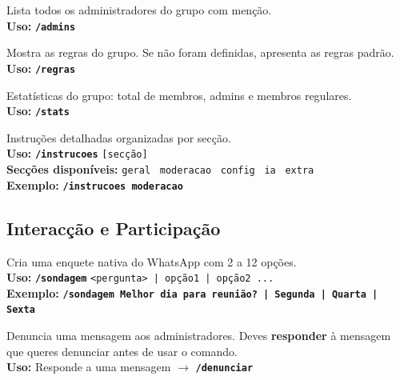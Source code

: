 \documentclass[12pt,a4paper]{article}
\newcommand{\cmd}[1]{\texttt{\textcolor{orbisblue}{\textbf{#1}}}}
\newcommand{\param}[1]{\texttt{\textcolor{orbisMid}{#1}}}
\begin{document}
\begin{tcolorbox}[cmdbox, title={\faCrown\ /admins}]
Lista todos os administradores do grupo com menção.\\
\textbf{Uso:} \cmd{/admins}
\end{tcolorbox}

\begin{tcolorbox}[cmdbox, title={\faScroll\ /regras}]
Mostra as regras do grupo. Se não foram definidas, apresenta as regras padrão.\\
\textbf{Uso:} \cmd{/regras}
\end{tcolorbox}

\begin{tcolorbox}[cmdbox, title={\faChartBar\ /stats}]
Estatísticas do grupo: total de membros, admins e membros regulares.\\
\textbf{Uso:} \cmd{/stats}
\end{tcolorbox}

\begin{tcolorbox}[cmdbox, title={\faBook\ /instrucoes}]
Instruções detalhadas organizadas por secção.\\
\textbf{Uso:} \cmd{/instrucoes} \param{[secção]}\\
\textbf{Secções disponíveis:} \param{geral} \textbar\ \param{moderacao} \textbar\ \param{config} \textbar\ \param{ia} \textbar\ \param{extra}\\
\textbf{Exemplo:} \cmd{/instrucoes moderacao}
\end{tcolorbox}

\subsection{Interacção e Participação}

\begin{tcolorbox}[cmdbox, title={\faPoll\ /sondagem}]
Cria uma enquete nativa do WhatsApp com 2 a 12 opções.\\
\textbf{Uso:} \cmd{/sondagem} \param{<pergunta> | opção1 | opção2 ...}\\
\textbf{Exemplo:} \cmd{/sondagem Melhor dia para reunião? | Segunda | Quarta | Sexta}
\end{tcolorbox}

\begin{tcolorbox}[cmdbox, title={\faFlag\ /denunciar}]
Denuncia uma mensagem aos administradores. Deves \textbf{responder} à mensagem que queres denunciar antes de usar o comando.\\
\textbf{Uso:} Responde a uma mensagem $\to$ \cmd{/denunciar}
\end{tcolorbox}
\end{document}
